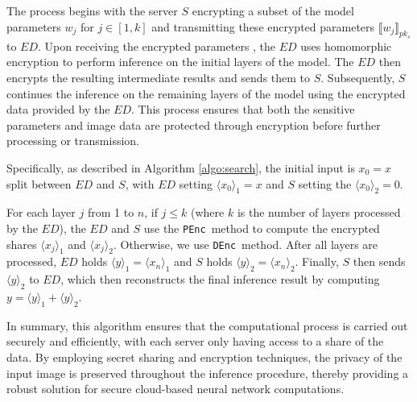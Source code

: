 ﻿\documentclass[conference]{IEEEtran}
\newcommand{\DEnc}{\texttt{DEnc}}
\newcommand{\PEnc}{\texttt{PEnc}}
\begin{document}
The process begins with the server $S$ encrypting a subset of the model parameters $w_j$ for $j \in [1,k]$ and transmitting these encrypted parameters $\llbracket w_j \rrbracket_{pk_s}$ to $ED$. Upon receiving the encrypted parameters , the $ED$ uses homomorphic encryption to perform inference on the initial layers of the model. The $ED$ then encrypts the resulting intermediate results and sends them to $S$. Subsequently, $S$ continues the inference on the remaining layers of the model using the encrypted data provided by the $ED$. This process ensures that both the sensitive parameters and image data are protected through encryption before further processing or transmission.

Specifically, as described in Algorithm \ref{algo:search}, the initial input is $x_0=x$ split between  $ED$ and $S$, with $ED$ setting $\langle x_0\rangle_1=x$ and $S$ setting the $\langle x_0\rangle_2=0$. 

For each layer $j$ from 1 to $n$, if $j \leq k$ (where $k$ is the number of layers processed by the $ED$), the $ED$ and $S$ use the \PEnc~method to compute the encrypted shares $\langle x_j \rangle_1$ and $\langle x_j \rangle_2$. Otherwise, we use \DEnc~method.
 After all layers are processed, $ED$ holds $\langle y \rangle_1=\langle x_n\rangle_1$ and $S$ holds $\langle y \rangle_2=\langle x_n\rangle_2$. Finally, $S$ then sends $\langle y \rangle_2$ to $ED$, which then reconstructs the final inference result by computing $y=\langle y \rangle_1+\langle y \rangle_2$.

In summary, this algorithm ensures that the computational process is carried out securely and efficiently, with each server only having access to a share of the data. By employing secret sharing and encryption techniques, the privacy of the input image is preserved throughout the inference procedure, thereby providing a robust solution for secure cloud-based neural network computations.


\end{document}
